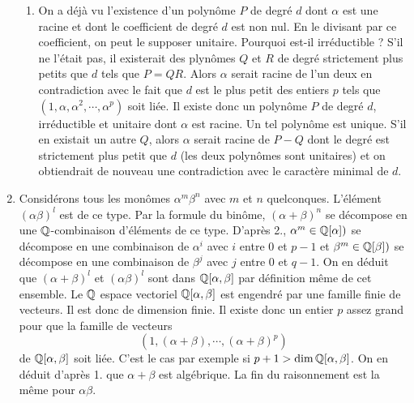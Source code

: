 \begin{enumerate}
\begin{enumerate}
\item On a déjà vu l'existence d'un polynôme $P$ de degré $d$ dont $\alpha$ est une racine et dont le coefficient de degré $d$ est non nul. En le divisant par ce coefficient, on peut le supposer unitaire. Pourquoi est-il irréductible ?\newline
S'il ne l'était pas, il existerait des plynômes $Q$ et $R$ de degré strictement plus petits que $d$ tels que $P=QR$. Alors $\alpha$ serait racine de l'un deux en contradiction avec le fait que $d$ est le plus petit des entiers $p$ tels que $(1,\alpha,\alpha^2,\cdots,\alpha^p)$ soit liée.\newline
Il existe donc un polynôme $P$ de degré $d$, irréductible et unitaire dont $\alpha$ est racine.\newline
Un tel polynôme est unique. S'il en existait un autre $Q$, alors $\alpha$ serait racine de $P-Q$ dont le degré est strictement plus petit que $d$ (les deux polynômes sont unitaires) et on obtiendrait de nouveau une contradiction avec le caractère minimal de $d$.
\end{enumerate}

\item Considérons tous les monômes $\alpha^m\beta^n$ avec $m$ et $n$ quelconques.\newline
L'élément $(\alpha\beta)^l$ est de ce type. Par la formule du binôme, $(\alpha+\beta)^n$ se décompose en une $\mathbb{Q}$-combinaison d'éléments de ce type.\newline
D'après 2., $\alpha^m\in\mathbb{Q}[\alpha])$ se décompose en une combinaison de $\alpha^i$ avec $i$ entre $0$ et $p-1$ et $\beta^m\in\mathbb{Q}[\beta])$ se décompose en une combinaison de $\beta^j$ avec $j$ entre $0$ et $q-1$. On en déduit que $(\alpha+\beta)^l$ et $(\alpha\beta)^l$ sont dans $\mathbb{Q}[\alpha,\beta]$ par définition même de cet ensemble.\newline
Le $\mathbb{Q}$ espace vectoriel $\mathbb{Q}[\alpha,\beta]$ est engendré par une famille finie de vecteurs. Il est donc de dimension finie. Il existe donc un entier $p$ assez grand pour que la famille de vecteurs
\begin{displaymath}
 (1,(\alpha+\beta),\cdots,(\alpha+\beta)^p)
\end{displaymath}
de $\mathbb{Q}[\alpha,\beta]$ soit liée. C'est le cas par exemple si $p+1>\dim \mathbb{Q}[\alpha,\beta]$. On en déduit d'après 1. que $\alpha+\beta$ est algébrique. La fin du raisonnement est la même pour $\alpha\beta$.
\end{enumerate}

